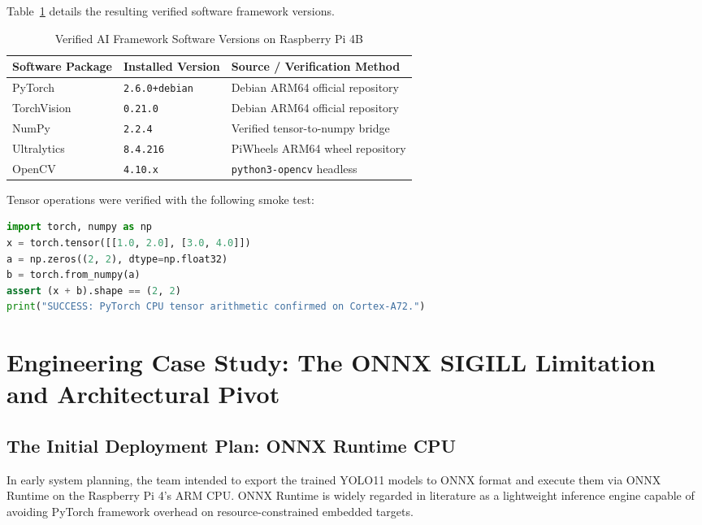 \documentclass[12pt,a4paper]{article}
\begin{document}
Table~\ref{tab:py_packages} details the resulting verified software framework versions.

\begin{table}[H]
\centering
\caption{Verified AI Framework Software Versions on Raspberry Pi 4B}\label{tab:py_packages}
\begin{tabular}{lll}
\toprule
\textbf{Software Package} & \textbf{Installed Version} & \textbf{Source / Verification Method} \\
\midrule
PyTorch     & \texttt{2.6.0+debian}   & Debian ARM64 official repository \\
TorchVision & \texttt{0.21.0}         & Debian ARM64 official repository \\
NumPy       & \texttt{2.2.4}          & Verified tensor-to-numpy bridge \\
Ultralytics & \texttt{8.4.216}        & PiWheels ARM64 wheel repository \\
OpenCV      & \texttt{4.10.x}         & \texttt{python3-opencv} headless \\
\bottomrule
\end{tabular}
\end{table}

\noindent Tensor operations were verified with the following smoke test:
\begin{lstlisting}[language=python, caption={CPU tensor verification script}]
import torch, numpy as np
x = torch.tensor([[1.0, 2.0], [3.0, 4.0]])
a = np.zeros((2, 2), dtype=np.float32)
b = torch.from_numpy(a)
assert (x + b).shape == (2, 2)
print("SUCCESS: PyTorch CPU tensor arithmetic confirmed on Cortex-A72.")
\end{lstlisting}

\clearpage

\section{Engineering Case Study: The ONNX SIGILL Limitation and Architectural Pivot}

\subsection{The Initial Deployment Plan: ONNX Runtime CPU}

In early system planning, the team intended to export the trained YOLO11 models to ONNX
format and execute them via ONNX Runtime on the Raspberry Pi 4's ARM CPU. ONNX Runtime
is widely regarded in literature as a lightweight inference engine capable of avoiding
PyTorch framework overhead on resource-constrained embedded targets.
\end{document}
